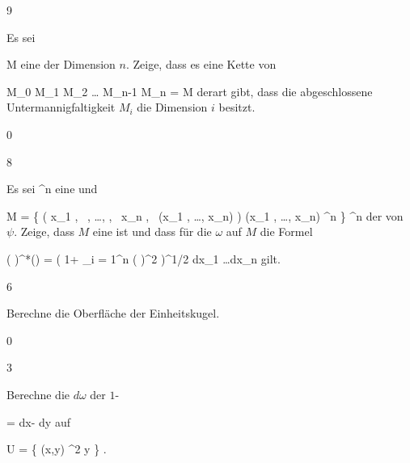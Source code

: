 {9}
{

Es sei

\mavergleichskette
{\vergleichskette
{ M
}
{ \neq }{ \emptyset
}
{  }{
}
{    }{
}
{   }{
}
}
{}{}{}
eine
der Dimension $n$. Zeige, dass es eine Kette von

\mavergleichskettedisp
{\vergleichskette
{ M_0
}
{ \subseteq} { M_1
}
{ \subseteq} { M_2
}
{ \subseteq  \ldots \subseteq} { M_{n-1}
}
{ \subseteq} { M_n
}
}
{
\vergleichskettefortsetzung
{ =} { M
}
{ } {}
{ } {}
{ } {}
}{}{}
derart gibt, dass die abgeschlossene Untermannigfaltigkeit $M_i$ die Dimension $i$ besitzt.

}
{} {}

{0}
{

}
{} {}

{8}
{

Es sei
\maabbdisp {\psi} {\R^n } {\R
} {}
eine
und

\mavergleichskettedisphandlinks
{\vergleichskettedisphandlinks
{M
}
{ =} { \left\{  \left(  x_1   , \,   , \ldots ,  , \,   x_n , \,   \psi(x_1 , \ldots , x_n)                \right)   \mid  (x_1 , \ldots , x_n) \in \R^n         \right\}
}
{ \subseteq} { \R^n \times \R
}
{ } {
}
{ } {
}
}
{}{}{}
der
von $\psi$. Zeige, dass $M$ eine
 
ist und dass für die
$\omega$ auf $M$ die Formel

\mavergleichskettedisp
{\vergleichskette
{ ( \times \psi)^*(\omega)
}
{ =} { \left(  1+ \sum_{i = 1}^n \left(  {  }  \right)^2  \right)^{1/2} dx_1 \wedge \ldots \wedge dx_n
}
{ } {
}
{ } {
}
{ } {
}
}
{}{}{}
gilt.

}
{} {}

{6}
{

Berechne die Oberfläche der Einheitskugel.

}
{} {}

{0}
{

}
{} {}

{3}
{

Berechne die
$d \omega$ der
$1$-

\mavergleichskettedisp
{\vergleichskette
{ \omega
}
{ =} { {  } dx- {  } dy
}
{ } {
}
{ } {
}
{ } {
}
}
{}{}{}
auf

\mavergleichskette
{\vergleichskette
{ U
}
{ = }{ \left\{ (x,y) \in \R^2  \mid   y          \right\}
}
{  }{
}
{    }{
}
{   }{
}
}
{}{}{.}

}
{} {}

